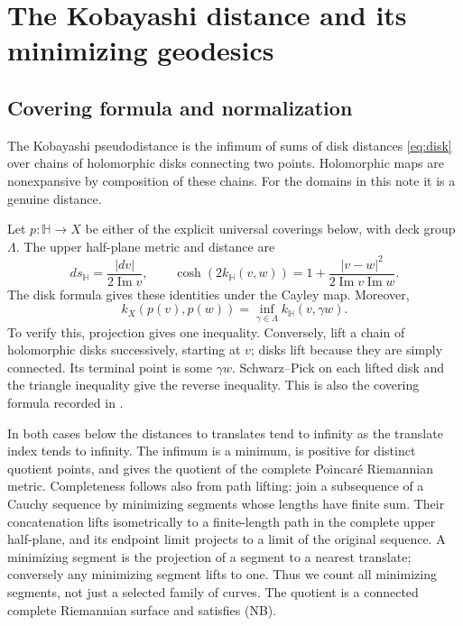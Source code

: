 \documentclass[12pt]{amsart}
\theoremstyle{definition}
\theoremstyle{remark}
\numberwithin{equation}{section}
\begin{document}
\section{The Kobayashi distance and its minimizing geodesics}\label{sec:geometry}
\subsection{Covering formula and normalization}
The Kobayashi pseudodistance is the infimum of sums of disk distances \eqref{eq:disk} over chains of holomorphic disks connecting two points. Holomorphic maps are nonexpansive by composition of these chains. For the domains in this note it is a genuine distance.

Let $p:\mathbb H\to X$ be either of the explicit universal coverings below, with deck group $\Lambda$. The upper half-plane metric and distance are
\begin{equation}\label{eq:halfplane}
 ds_{\mathbb H}=\frac{|dv|}{2\operatorname{Im}v},\qquad
 \cosh(2k_{\mathbb H}(v,w))=1+\frac{|v-w|^2}{2\operatorname{Im}v\operatorname{Im}w}.
\end{equation}
The disk formula gives these identities under the Cayley map. Moreover,
\begin{equation}\label{eq:quotient}
 k_X(p(v),p(w))=\inf_{\gamma\in\Lambda}k_{\mathbb H}(v,\gamma w).
\end{equation}
To verify this, projection gives one inequality. Conversely, lift a chain of holomorphic disks successively, starting at $v$; disks lift because they are simply connected. Its terminal point is some $\gamma w$. Schwarz--Pick on each lifted disk and the triangle inequality give the reverse inequality. This is also the covering formula recorded in \cite[Proposition 1.1]{Winkelmann}.

In both cases below the distances to translates tend to infinity as the translate index tends to infinity. The infimum is a minimum, is positive for distinct quotient points, and gives the quotient of the complete Poincar\'e Riemannian metric. Completeness follows also from path lifting: join a subsequence of a Cauchy sequence by minimizing segments whose lengths have finite sum. Their concatenation lifts isometrically to a finite-length path in the complete upper half-plane, and its endpoint limit projects to a limit of the original sequence. A minimizing segment is the projection of a segment to a nearest translate; conversely any minimizing segment lifts to one. Thus we count all minimizing segments, not just a selected family of curves. The quotient is a connected complete Riemannian surface and satisfies (NB).
\end{document}
